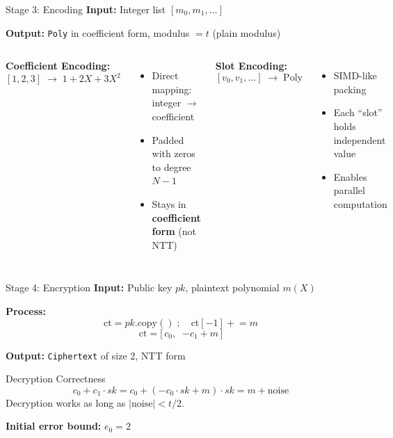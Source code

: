 \documentclass[aspectratio=169, 11pt]{beamer}
\begin{document}
\begin{frame}{Stage 3: Encoding}
\textbf{Input:} Integer list $[m_0, m_1, \ldots]$

\textbf{Output:} \texttt{Poly} in coefficient form, modulus $= t$ (plain modulus)

\vspace{0.5em}
\begin{columns}[T]
\textbf{Coefficient Encoding:}
\[
    [1, 2, 3] \;\longrightarrow\; 1 + 2X + 3X^2
\]
\begin{itemize}
    \item Direct mapping: integer $\to$ coefficient
    \item Padded with zeros to degree $N-1$
    \item Stays in \textbf{coefficient form} (not NTT)
\end{itemize}

\textbf{Slot Encoding:}
\[
    [v_0, v_1, \ldots] \;\longrightarrow\; \text{Poly}
\]
\begin{itemize}
    \item SIMD-like packing
    \item Each ``slot'' holds independent value
    \item Enables parallel computation
\end{itemize}
\end{columns}
\end{frame}

\begin{frame}{Stage 4: Encryption}
\textbf{Input:} Public key $pk$, plaintext polynomial $m(X)$

\vspace{0.3em}
\textbf{Process:}
\[
    \text{ct} = pk.\text{copy}() \;;\quad \text{ct}[-1] \mathrel{+}= m
\]
\[
    \text{ct} = \bigl[\,c_0,\;\; {-c_1 + m}\,\bigr]
\]

\vspace{0.3em}
\textbf{Output:} \texttt{Ciphertext} of size 2, NTT form

\vspace{0.5em}
\begin{block}{Decryption Correctness}
\[
    c_0 + c_1 \cdot sk = c_0 + (-c_0 \cdot sk + m) \cdot sk = m + \text{noise}
\]
Decryption works as long as $|\text{noise}| < t/2$.
\end{block}

\vspace{0.3em}
\textbf{Initial error bound:} $e_0 = 2$
\end{frame}
\end{document}

